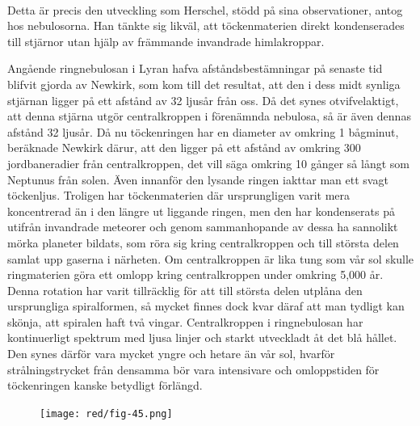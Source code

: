 \documentclass[a4paper, 12pt, oneside, swedish]{article}
\begin{document}
\paragraph{}
Detta är precis den utveckling som Herschel, stödd på sina observationer, antog hos nebulosorna. Han tänkte sig likväl, att töckenmaterien direkt kondenserades till stjärnor utan hjälp av främmande invandrade himlakroppar.

Angående ringnebulosan i Lyran hafva afståndsbestämningar på senaste tid blifvit gjorda av Newkirk, som kom till det resultat, att den i dess midt synliga stjärnan ligger på ett afstånd av 32 ljusår från oss. Då det synes otvifvelaktigt, att denna stjärna utgör centralkroppen i förenämnda nebulosa, så är även dennas afstånd 32 ljusår. Då nu töckenringen har en diameter av omkring 1 bågminut, beräknade Newkirk därur, att den ligger på ett afstånd av omkring 300 jordbaneradier från centralkroppen, det vill säga omkring 10 gånger så långt som Neptunus från solen. Även innanför den lysande ringen iakttar man ett svagt töckenljus. Troligen har töckenmaterien där ursprungligen varit mera koncentrerad än i den längre ut liggande ringen, men den har kondenserats på utifrån invandrade meteorer och genom sammanhopande av dessa ha sannolikt mörka planeter bildats, som röra sig kring centralkroppen och till största delen samlat upp gaserna i närheten. Om centralkroppen är lika tung som vår sol skulle ringmaterien göra ett omlopp kring centralkroppen under omkring 5,000 år. Denna rotation har varit tillräcklig för att till största delen utplåna den ursprungliga spiralformen, så mycket finnes dock kvar däraf att man tydligt kan skönja, att spiralen haft två vingar. Centralkroppen i ringnebulosan har kontinuerligt spektrum med ljusa linjer och starkt utveckladt åt det blå hållet. Den synes därför vara mycket yngre och hetare än vår sol, hvarför strålningstrycket från densamma bör vara intensivare och omloppstiden för töckenringen kanske betydligt förlängd.

\begin{figure}[H]
\centering
\texttt{[image: red/fig-45.png]}
\caption{}
\end{figure}
\end{document}
